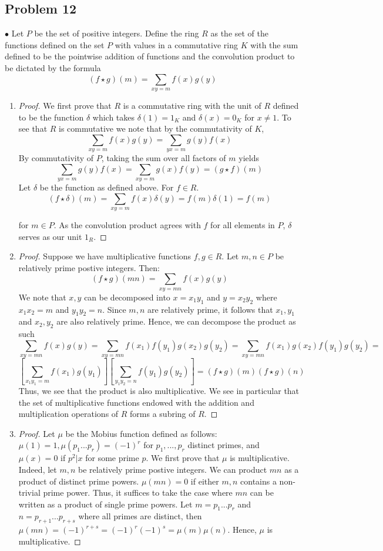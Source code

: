 \documentclass[Lang.tex]{subfiles}
\begin{document}
\subsection{Problem 12}			
 $\bullet$  Let $P$ be the set of positive integers. Define the ring $R$ as the set of the functions defined on the set $P$ with values in a commutative ring $K$ with the sum defined to be the pointwise addition of functions and the convolution product to be dictated by the formula
 $$ (f \star g)(m)  = \sum_{xy = m} f(x)g(y) $$ 
\begin{enumerate}
	\item 
	\begin{proof}
		We first prove that $R$ is a commutative ring with the unit of $R$ defined to be the function $\delta$ which takes $\delta(1) = 1_K$ and $\delta(x) = 0_K$ for $x \neq 1$. To see that $R$ is commutative we note that by the commutativity of $K$, $$ \sum_{xy = m}f(x)g(y) = \sum_{yx = m} g(y)f(x) $$ By commutativity of $P$, taking the sum over all factors of $m$ yields  $$\sum_{yx = m} g(y)f(x) = \sum_{xy = m} g(x)f(y) = (g\star f)(m)$$ Let $\delta$ be the function as defined above. For $f \in R$.
		$$ (f \star \delta)(m) = \sum_{xy = m} f(x)\delta(y) =  f(m)\delta(1)  = f(m) $$ 
		
		for $m \in P$. As the convolution product agrees with $f$ for all elements in $P$, $\delta$ serves as our unit $1_R$.
	\end{proof}
	\item 
		\begin{proof}
			Suppose we have multiplicative functions $f,g \in R$. Let $m,n \in P$ be relatively prime postive integers. Then:
			$$ (f \star g)(mn) = \sum_{xy = mn} f(x)g(y) $$ We note that $x,y$ can be decomposed into $x = x_1y_1$ and $y = x_2y_2$ where $x_1x_2  = m$ and $y_1y_2 = n$. Since $m,n$ are relatively prime, it follows that $x_1,y_1$ and $x_2,y_2$ are also relatively prime. Hence, we can decompose the product as such
			$$ \sum_{xy = mn} f(x)g(y) = \sum_{xy = mn} f(x_1)f(y_1)g(x_2)g(y_2) = \sum_{xy = mn} f(x_1)g(x_2)f(y_1)g(y_2) =$$
			$$ [\sum_{x_1y_1 = m} f(x_1)g(y_1)][\sum_{y_1y_2 = n} f(y_1)g(y_2)] = (f \star g)(m)(f \star g)(n)$$ Thus, we see that the product is also multiplicative. We see in particular that the set of multiplicative functions endowed with the addition and multiplication operations of $R$ forms a subring of $R$.
		\end{proof}
	\item
		\begin{proof}
			Let $\mu$ be the Mobius function defined as follows: $\mu(1) = 1,  \mu(p_1...p_r) = (-1)^r$ for $p_1,...,p_r$ distinct primes, and $\mu(x) = 0$ if $p^2 | x$ for some prime $p$. We first prove that $\mu$ is multiplicative. Indeed, let $m,n$ be relatively prime postive integers. We can product $mn$ as a product of distinct prime powers. $\mu(mn) = 0$ if either $m,n$ contains a non-trivial prime power. Thus, it suffices to take the case where $mn$ can be written as a product of single prime powers. Let $m = p_1...p_r$ and $n = p_{r+1}...p_{r+s}$ where all primes are distinct, then $\mu(mn) = (-1)^{r+s} = (-1)^r(-1)^s = \mu(m)\mu(n)$. Hence, $\mu$ is multiplicative. 
			

\end{proof}
\end{enumerate}
\end{document}

